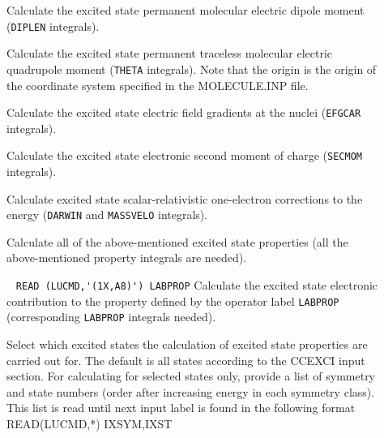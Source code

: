 \begin{description}
\item[]
        Calculate the excited state permanent molecular electric dipole moment
        (\verb+DIPLEN+ integrals).
%
\item[]
        Calculate the excited state permanent traceless molecular electric
        quadrupole moment (\verb+THETA+ integrals). Note that the
        origin is the origin of the coordinate system specified
        in the MOLECULE.INP file.
%
\item[]
        Calculate the excited state electric field gradients at the nuclei
        (\verb+EFGCAR+ integrals).
%
\item[]
        Calculate the excited state electronic second moment of charge
        (\verb+SECMOM+ integrals).
%
\item[]
        Calculate excited state scalar-relativistic one-electron
        corrections to the 
        energy (\verb+DARWIN+ and \verb+MASSVELO+ integrals).
%
\item[]
        Calculate all of the above-mentioned excited state properties (all the
        above-mentioned property integrals are needed).
%
\item[] \verb| |\newline
\verb|READ (LUCMD,'(1X,A8)') LABPROP|\newline
        Calculate the excited state electronic contribution to the property defined
        by the operator label \verb+LABPROP+ (corresponding
        \verb+LABPROP+ integrals needed).


\item[] 

Select which excited states the calculation of excited state properties 
are carried out for. The default is all states according to the CCEXCI input section.
For calculating for selected states only,
provide a list of symmetry and state numbers (order after increasing energy in
each symmetry class).
This list is read until next input label is found in the following format\\

READ(LUCMD,*) IXSYM,IXST \\


\end{description}


